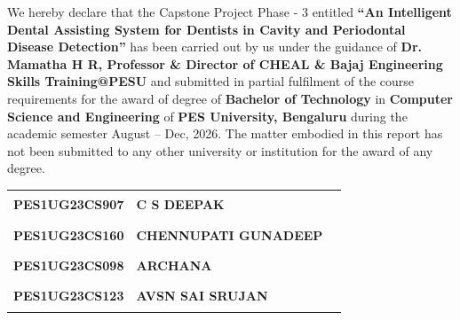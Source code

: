 \thispagestyle{empty}
\vspace*{12mm}
\vspace{6mm}
\begingroup
\justifying
{}
We hereby declare that the Capstone Project Phase - 3 entitled \textbf{``An Intelligent Dental
Assisting System for Dentists in Cavity and Periodontal Disease Detection''} has been carried out by
us under the guidance of \textbf{Dr. Mamatha H R, Professor \& Director of CHEAL \& Bajaj Engineering
Skills Training@PESU} and submitted in partial fulfilment of the course requirements for the award of
degree of \textbf{Bachelor of Technology} in \textbf{Computer Science and Engineering} of
\textbf{PES University, Bengaluru} during the academic semester August -- Dec, 2026. The matter
embodied in this report has not been submitted to any other university or institution for the award
of any degree.\par
\endgroup
\vspace{22mm}
\begin{center}
\singlespacing
{\fontsize{12}{15}\selectfont
\begin{tabular}{@{}L{4.0cm}L{6.0cm}L{4.2cm}@{}}
\textbf{PES1UG23CS907} & \textbf{C S DEEPAK}          & \rule{3.6cm}{0.4pt}\\[9mm]
\textbf{PES1UG23CS160} & \textbf{CHENNUPATI GUNADEEP} & \rule{3.6cm}{0.4pt}\\[9mm]
\textbf{PES1UG23CS098} & \textbf{ARCHANA}             & \rule{3.6cm}{0.4pt}\\[9mm]
\textbf{PES1UG23CS123} & \textbf{AVSN SAI SRUJAN}     & \rule{3.6cm}{0.4pt}\\
\end{tabular}}
\end{center}
\clearpage

